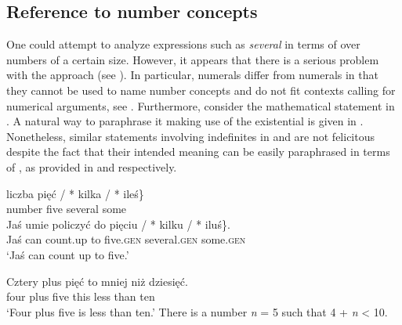 \documentclass[output=paper, newtxmath, colorlinks, citecolor=brown]{langsci/langscibook}
\begin{document}
	\subsection{Reference to number concepts}\label{sec:reference-to-number-concepts}
	\largerpage[2]
	One could attempt to analyze  expressions such as  \textit{several} in terms of  over numbers of a certain size. However, it appears that there is a serious problem with the  approach (see \citealt{schwarzschild2002grammar}). In particular,  numerals differ from  numerals in that they cannot be used to name number concepts and do not fit contexts calling for numerical arguments, see . Furthermore, consider the mathematical statement in . A natural way to paraphrase it making use of the existential  is given in . Nonetheless, similar statements involving indefinites in  and  are not felicitous despite the fact that their intended meaning can be easily paraphrased in terms of , as provided in  and  respectively.

	\ea \label{ex:numerical-arguments} \ea \gll liczba \minsp{\{} pięć / *\hspace{-2pt} kilka / *\hspace{-2pt} {ileś\}}\label{ex:numerical-arguments-naming-numbers}\\
	number {} five {} {} several {} {} some\\
	\ex \gll Jaś umie policzyć do \minsp{\{} pięciu / *\hspace{-2pt} kilku / *\hspace{-2pt} {iluś\}}.\label{ex:numerical-arguments-context}\\
	Jaś can count.up to {} five.\textsc{gen} {} {} several.\textsc{gen} {} {} some.\textsc{gen}\\
	\glt `Jaś can count up to five.'
	\z
    \z

	\ea \label{ex:numerical-contexts-math} \ea \gll Cztery plus pięć to mniej niż dziesięć.\label{ex:numerical-contexts-math-cardinal}\\
	four plus five this less than ten\\
	\glt `Four plus five is less than ten.'
	\ex There is a number \textit{n} = 5 such that 4 + \textit{n} < 10.\label{ex:numerical-contexts-math-cardinal-paraphrase}
	\z
    \z
\end{document}
